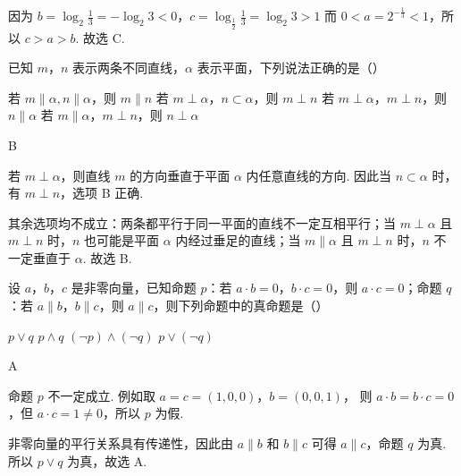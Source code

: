 \begin{solution}
因为
\(b=\log_2\frac13=-\log_2 3<0\)，\(c=\log_{\frac12}\frac13=\log_2 3>1\)
而 \(0<a=2^{-\frac{1}{3}}<1\)，所以 \(c>a>b\). 故选 C.
\end{solution}

\begin{problem}
已知 \(m\)，\(n\) 表示两条不同直线，\(\alpha\) 表示平面，下列说法正确的是（\quad）

\choices
    {若 \(m \parallel \alpha, n \parallel \alpha\)，则 \(m \parallel n\)}
    {若 \(m \perp \alpha\)，\(n \subset \alpha\)，则 \(m \perp n\)}
    {若 \(m \perp \alpha\)，\(m \perp n\)，则 \(n \parallel \alpha\)}
    {若 \(m \parallel \alpha\)，\(m \perp n\)，则 \(n \perp \alpha\)}
\end{problem}

\begin{answer}
B
\end{answer}

\begin{solution}
若 \(m\perp\alpha\)，则直线 \(m\) 的方向垂直于平面 \(\alpha\) 内任意直线的方向. 因此当 \(n\subset\alpha\) 时，有 \(m\perp n\)，选项 B 正确.

其余选项均不成立：两条都平行于同一平面的直线不一定互相平行；当 \(m\perp\alpha\) 且 \(m\perp n\) 时，\(n\) 也可能是平面 \(\alpha\) 内经过垂足的直线；当 \(m\parallel\alpha\) 且 \(m\perp n\) 时，\(n\) 不一定垂直于 \(\alpha\). 故选 B.
\end{solution}

\begin{problem}
设 \(a\)，\(b\)，\(c\) 是非零向量，已知命题 \(p\)：若 \(a \cdot b = 0\)，\(b \cdot c = 0\)，则 \(a \cdot c = 0\)；命题 \(q\)：若 \(a \parallel b\)，\(b \parallel c\)，则 \(a \parallel c\)，则下列命题中的真命题是（\quad）

\choices
    {\(p \vee q\)}
    {\(p \wedge q\)}
    {\((\neg p) \land (\neg q)\)}
    {\(p \vee (\neg q)\)}
\end{problem}

\begin{answer}
A
\end{answer}

\begin{solution}
命题 \(p\) 不一定成立. 例如取
\(a=c=(1,0,0)\)，\(b=(0,0,1)\)，
则 \(a\cdot b=b\cdot c=0\)，但 \(a\cdot c=1\neq0\)，所以 \(p\) 为假.

非零向量的平行关系具有传递性，因此由 \(a\parallel b\) 和 \(b\parallel c\) 可得 \(a\parallel c\)，命题 \(q\) 为真. 所以 \(p\vee q\) 为真，故选 A.
\end{solution}

